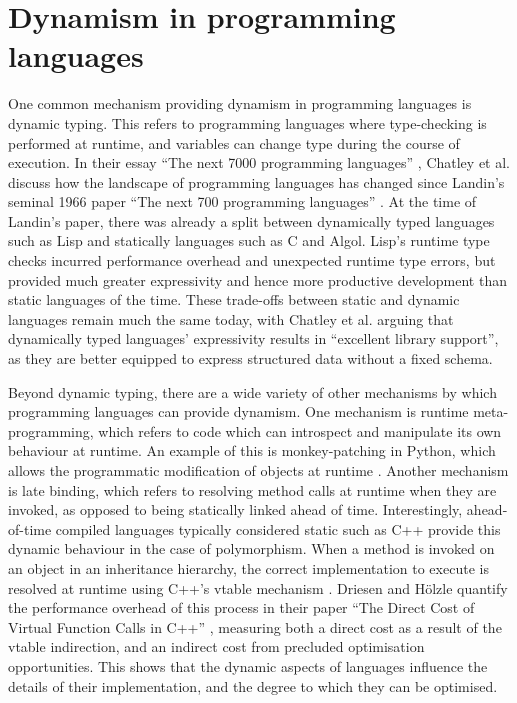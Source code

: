 \section{Dynamism in programming languages}
\label{sec:impact-dynamism-related-work}

One common mechanism providing dynamism in programming languages is dynamic typing. This refers to programming languages where type-checking is performed at runtime, and variables can change type during the course of execution.
In their essay ``The next 7000 programming languages'' \cite{chatleyNext7000Programming2019}, Chatley et al. discuss how the landscape of programming languages has changed since Landin's seminal 1966 paper ``The next 700 programming languages'' \cite{landinNext700Programming1966}. At the time of Landin's paper, there was already a split between dynamically typed languages such as Lisp and statically languages such as C and Algol. Lisp's runtime type checks incurred performance overhead and unexpected runtime type errors, but provided much greater expressivity and hence more productive development than static languages of the time. These trade-offs between static and dynamic languages remain much the same today, with Chatley et al. arguing that dynamically typed languages' expressivity results in ``excellent library support'', as they are better equipped to express structured data without a fixed schema.

Beyond dynamic typing, there are a wide variety of other mechanisms by which programming languages can provide dynamism.
One mechanism is runtime meta-programming, which refers to code which can introspect and manipulate its own behaviour at runtime. An example of this is monkey-patching in Python, which allows the programmatic modification of objects at runtime \cite{Hunt2023}.
Another mechanism is late binding, which refers to resolving method calls at runtime when they are invoked, as opposed to being statically linked ahead of time. Interestingly, ahead-of-time compiled languages typically considered static such as C++ provide this dynamic behaviour in the case of polymorphism. When a method is invoked on an object in an inheritance hierarchy, the correct implementation to execute is resolved at runtime using C++'s \ac{vtable} mechanism \cite{liangUnderstandVtableAssembly}. Driesen and H\"olzle quantify the performance overhead of this process in their paper ``The Direct Cost of Virtual Function Calls in C++'' \cite{driesenDirectCostVirtual1996}, measuring both a direct cost as a result of the \ac{vtable} indirection, and an indirect cost from precluded optimisation opportunities.
This shows that the dynamic aspects of languages influence the details of their implementation, and the degree to which they can be optimised.

